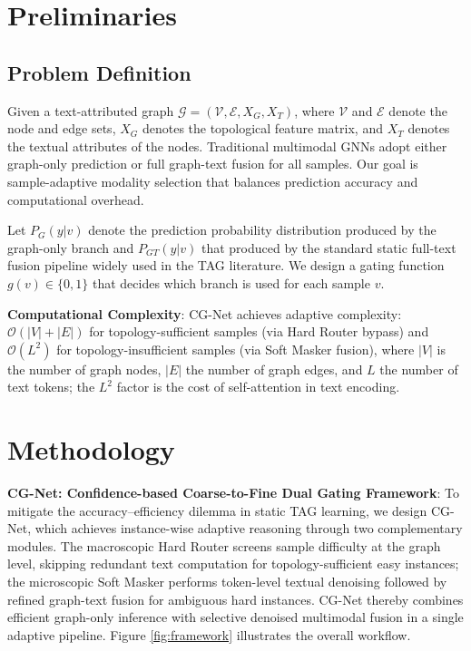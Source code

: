\documentclass[preprint,12pt,authoryear]{elsarticle}
\begin{document}
\section{Preliminaries}
\subsection{Problem Definition}
Given a text-attributed graph $\mathcal{G} = (\mathcal{V}, \mathcal{E}, X_G, X_T)$, where $\mathcal{V}$ and $\mathcal{E}$ denote the node and edge sets, $X_G$ denotes the topological feature matrix, and $X_T$ denotes the textual attributes of the nodes. Traditional multimodal GNNs adopt either graph-only prediction or full graph-text fusion for all samples. Our goal is sample-adaptive modality selection that balances prediction accuracy and computational overhead.

Let $P_G(y|v)$ denote the prediction probability distribution produced by the graph-only branch and $P_{GT}(y|v)$ that produced by the standard static full-text fusion pipeline widely used in the TAG literature. We design a gating function $g(v) \in \{0, 1\}$ that decides which branch is used for each sample $v$.

\noindent\textbf{Computational Complexity}: CG-Net achieves adaptive complexity: $\mathcal{O}(|V|+|E|)$ for topology-sufficient samples (via Hard Router bypass) and $\mathcal{O}(L^2)$ for topology-insufficient samples (via Soft Masker fusion), where $|V|$ is the number of graph nodes, $|E|$ the number of graph edges, and $L$ the number of text tokens; the $L^2$ factor is the cost of self-attention in text encoding.

\section{Methodology}
\noindent\textbf{CG-Net: Confidence-based Coarse-to-Fine Dual Gating Framework}: To mitigate the accuracy--efficiency dilemma in static TAG learning, we design CG-Net, which achieves instance-wise adaptive reasoning through two complementary modules. The macroscopic Hard Router screens sample difficulty at the graph level, skipping redundant text computation for topology-sufficient easy instances; the microscopic Soft Masker performs token-level textual denoising followed by refined graph-text fusion for ambiguous hard instances. CG-Net thereby combines efficient graph-only inference with selective denoised multimodal fusion in a single adaptive pipeline. Figure \ref{fig:framework} illustrates the overall workflow.
\end{document}
